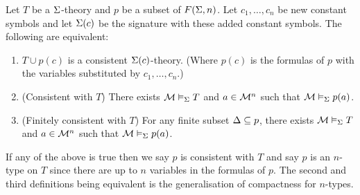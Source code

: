 \begin{dfn}
    Let $T$ be a $\Sigma$-theory and $p$ be a subset of $F(\Sigma,n)$.
    Let $c_1,\dots,c_n$ be new constant symbols and let $\Sigma(c)$ be 
    the signature with these added constant symbols.
    The following are equivalent:
    \begin{enumerate}
        \item $T \cup p(c)$ is a consistent $\Sigma(c)$-theory.
            (Where $p(c)$ is the formulas of $p$ with the variables substituted 
            by $c_1,\dots,c_n$.)
        \item (Consistent with $T$) There exists 
            $\mathcal{M} \vDash_{\Sigma} T$ and $a \in {\mathcal{M}}^n$
            such that $\mathcal{M} \vDash_{\Sigma} p(a)$. 
        \item (Finitely consistent with $T$) 
            For any finite subset $\Delta \subseteq p$, there exists 
            $\mathcal{M} \vDash_{\Sigma} T$ and $a \in {\mathcal{M}}^n$
            such that $\mathcal{M} \vDash_{\Sigma} p(a)$. 
    \end{enumerate}
    If any of the above is true then we say $p$ is consistent with $T$ and say 
    $p$ is an $n$-type on $T$ since there are up to $n$ variables in the 
    formulas of $p$.
    The second and third definitions being equivalent is the generalisation 
    of compactness for $n$-types.
\end{dfn}
